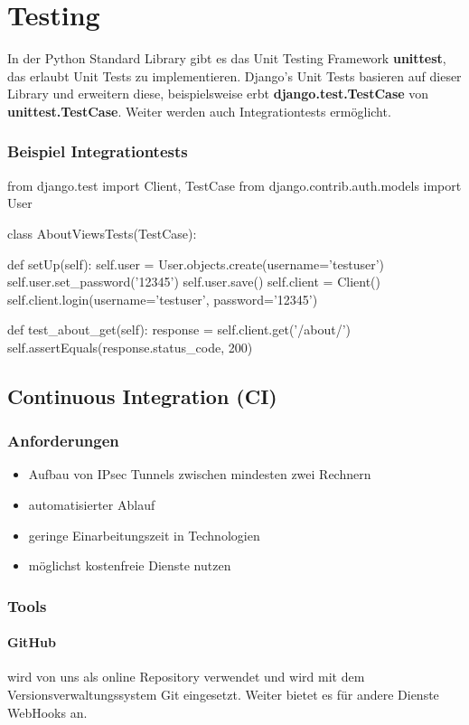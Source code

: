 \section{Testing}
In der Python Standard Library gibt es das Unit Testing Framework \textbf{unittest}, das erlaubt Unit Tests zu implementieren. 
Django's Unit Tests basieren auf dieser Library und erweitern diese, beispielsweise erbt \textbf{django.test.TestCase} von \textbf{unittest.TestCase}. Weiter werden auch Integrationtests ermöglicht.

\subsubsection{Beispiel Integrationtests}
\begin{python}
from django.test import Client, TestCase
from django.contrib.auth.models import User

class AboutViewsTests(TestCase):

   def setUp(self):
       self.user = User.objects.create(username='testuser')
       self.user.set_password('12345')
       self.user.save()
       self.client = Client()
       self.client.login(username='testuser', password='12345')

   def test_about_get(self):
       response = self.client.get('/about/')
       self.assertEquals(response.status_code, 200)      
\end{python}

\subsection{Continuous Integration (CI)}
\subsubsection{Anforderungen}
\begin{itemize}
	\item Aufbau von IPsec Tunnels zwischen mindesten zwei Rechnern
	\item automatisierter Ablauf
	\item geringe Einarbeitungszeit in Technologien
	\item möglichst kostenfreie Dienste nutzen
\end{itemize}
\subsubsection{Tools}
\paragraph{GitHub} wird von uns als online Repository verwendet und wird mit dem Versionsverwaltungssystem Git eingesetzt. Weiter bietet es für andere Dienste WebHooks an. 
